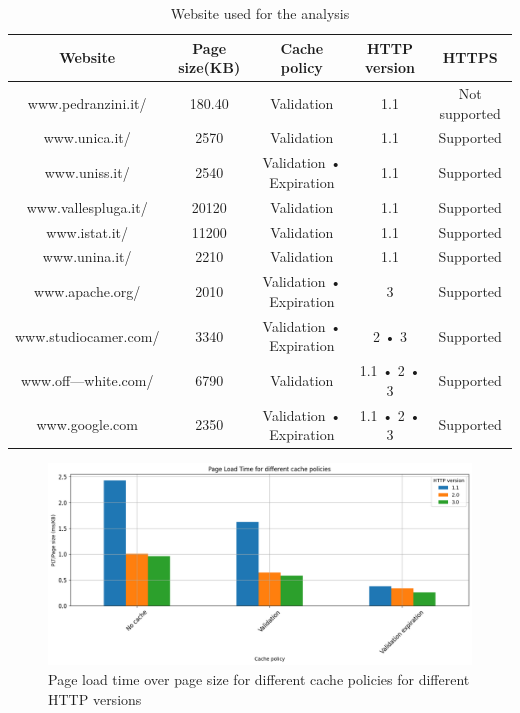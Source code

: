 \documentclass[eng]{class}
\begin{document}
\begin{table}[H]
  \tiny
  \centering
  \begin{tabular}{|c|c|c|c|c|}
    \hline
    \linewidth=0cm
    Website              & Page size(KB) & Cache policy            & HTTP version & HTTPS         \\
    \hline
    www.pedranzini.it/   & 180.40        & Validation              & 1.1          & Not supported \\
    www.unica.it/        & 2570          & Validation              & 1.1          & Supported     \\
    www.uniss.it/        & 2540          & Validation • Expiration & 1.1          & Supported     \\
    www.vallespluga.it/  & 20120         & Validation              & 1.1          & Supported     \\
    www.istat.it/        & 11200         & Validation              & 1.1          & Supported     \\
    www.unina.it/        & 2210          & Validation              & 1.1          & Supported     \\
    www.apache.org/      & 2010          & Validation • Expiration & 3            & Supported     \\
    www.studiocamer.com/ & 3340          & Validation • Expiration & 2 • 3        & Supported     \\
    www.off---white.com/ & 6790          & Validation              & 1.1 • 2 • 3  & Supported     \\
    www.google.com       & 2350          & Validation • Expiration & 1.1 • 2 • 3  & Supported     \\
    \hline
  \end{tabular}
  \caption{Website used for the analysis}
  \label{tab-2}
\end{table}

\begin{figure}[H]
  \centering
  \includegraphics[width=\columnwidth]{images/plt_cache_policy.png}
  \caption{Page load time over page size for different cache policies for different HTTP versions}
  \label{fig-2}
\end{figure}
\end{document}
